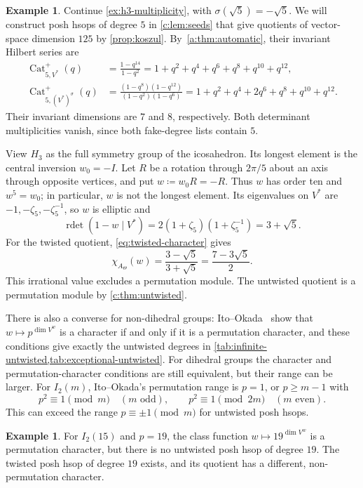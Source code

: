 \documentclass[10pt,a4paper]{amsart}
\newcommand{\defeq}{\coloneqq}
\DeclareMathOperator{\Cat}{Cat}
\DeclareMathOperator{\rdet}{rdet}
\theoremstyle{definition}
\newtheorem{example}[theorem]{Example}
\begin{document}
\begin{example}\label{ex:h3-two-types}
Continue \cref{ex:h3-multiplicity}, with $\sigma(\sqrt5)=-\sqrt5$. We will construct posh hsops of degree $5$ in \cref{c:lem:seeds}
that give quotients of vector-space dimension $125$ by \cref{prop:koszul}.
By~\cref{a:thm:automatic}, their invariant Hilbert series are
\begin{align*}
 \Cat^+_{5,V^*}(q)
 &=\frac{1-q^{14}}{1-q^2}
   =1+q^2+q^4+q^6+q^8+q^{10}+q^{12},\\
 \Cat^+_{5,(V^*)^\sigma}(q)
 &=\frac{(1-q^8)(1-q^{12})}{(1-q^2)(1-q^6)}
   =1+q^2+q^4+2q^6+q^8+q^{10}+q^{12}.
\end{align*}
Their invariant dimensions are $7$ and $8$, respectively. Both
determinant multiplicities vanish, since both fake-degree lists contain $5$.

View $H_3$ as the full symmetry group of the icosahedron. Its longest
element is the central inversion $w_0=-I$. Let $R$ be a rotation through
$2\pi/5$ about an axis through opposite vertices, and put
$w\defeq w_0R=-R$. Thus $w$ has order ten and $w^5=w_0$; in particular,
$w$ is not the longest element. Its eigenvalues on $V^*$ are
$-1,-\zeta_5,-\zeta_5^{-1}$, so $w$ is elliptic and
\[
 \rdet(1-w\mid V^*)=2(1+\zeta_5)(1+\zeta_5^{-1})=3+\sqrt5.
\]
For the twisted quotient, \cref{eq:twisted-character} gives
\[
 \chi_{A_\Theta}(w)=\frac{3-\sqrt5}{3+\sqrt5}
                  =\frac{7-3\sqrt5}{2}.
\]
This irrational value excludes a permutation module. The untwisted
quotient is a permutation module by \cref{c:thm:untwisted}.
\end{example}

There is also a converse for non-dihedral groups:
Ito--Okada~\cite[Theorem 1.4]{IO} show that $w\mapsto p^{\dim V^w}$ is a character if and
only if it is a permutation character, and these conditions give
exactly the untwisted degrees in \cref{tab:infinite-untwisted,tab:exceptional-untwisted}.
For dihedral groups the character and permutation-character
conditions are still equivalent, but their range can be larger.
For $I_2(m)$, Ito--Okada's permutation range is $p=1$,
or $p\ge m-1$ with
\[
 p^2\equiv1\pmod m\quad(m\text{ odd}),\qquad
 p^2\equiv1\pmod{2m}\quad(m\text{ even}).
\]
This can exceed the range $p\equiv\pm1\pmod m$ for untwisted posh hsops.

\begin{example}\label{c:ex:dihedral-permutation-without-hsop}
For $I_2(15)$ and $p=19$, the class function
$w\mapsto19^{\dim V^w}$ is a permutation character, but there is no
untwisted posh hsop of degree $19$. The twisted
posh hsop of degree $19$ exists, and its quotient has a different, non-permutation character.
\end{example}
\end{document}
